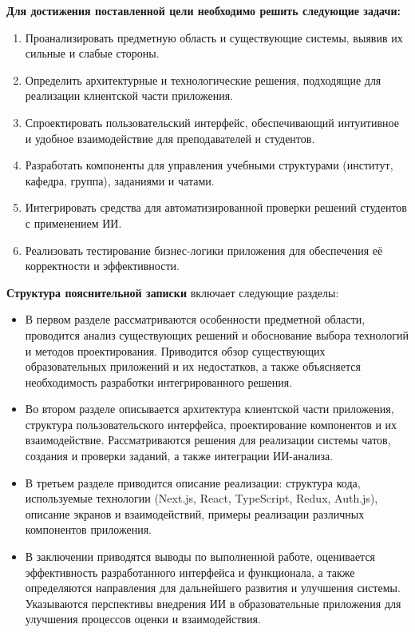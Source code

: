\textbf{Для достижения поставленной цели необходимо решить следующие задачи:}
\begin{enumerate}
\item Проанализировать предметную область и существующие системы, выявив их сильные и слабые стороны.
\item Определить архитектурные и технологические решения, подходящие для реализации клиентской части приложения.
\item Спроектировать пользовательский интерфейс, обеспечивающий интуитивное и удобное взаимодействие для преподавателей и студентов.
\item Разработать компоненты для управления учебными структурами (институт, кафедра, группа), заданиями и чатами.
\item Интегрировать средства для автоматизированной проверки решений студентов с применением ИИ.
\item Реализовать тестирование бизнес-логики приложения для обеспечения её корректности и эффективности.
\end{enumerate}

\textbf{Структура пояснительной записки} включает следующие разделы:
\begin{itemize}
\item В первом разделе рассматриваются особенности предметной области, проводится анализ существующих решений и обоснование выбора технологий и методов проектирования. Приводится обзор существующих образовательных приложений и их недостатков, а также объясняется необходимость разработки интегрированного решения.
\item Во втором разделе описывается архитектура клиентской части приложения, структура пользовательского интерфейса, проектирование компонентов и их взаимодействие. Рассматриваются решения для реализации системы чатов, создания и проверки заданий, а также интеграции ИИ-анализа.
\item В третьем разделе приводится описание реализации: структура кода, используемые технологии (Next.js, React, TypeScript, Redux, Auth.js), описание экранов и взаимодействий, примеры реализации различных компонентов приложения.
\item В заключении приводятся выводы по выполненной работе, оценивается эффективность разработанного интерфейса и функционала, а также определяются направления для дальнейшего развития и улучшения системы. Указываются перспективы внедрения ИИ в образовательные приложения для улучшения процессов оценки и взаимодействия.
\end{itemize}